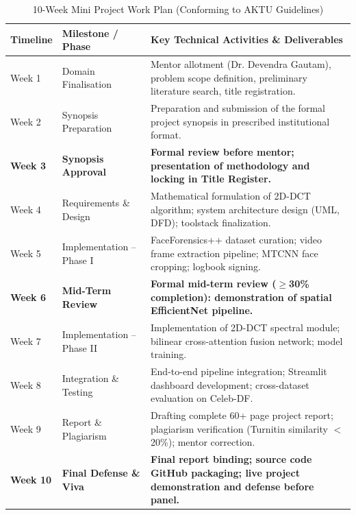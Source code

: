 \documentclass[12pt,a4paper]{report}
\begin{document}
\begin{table}[htbp]
\centering
\small
\caption{10-Week Mini Project Work Plan (Conforming to AKTU Guidelines)}
\label{tab:timeline}
\begin{tabular}{p{1.8cm} p{4.2cm} p{8.0cm}}
\toprule
\textbf{Timeline} & \textbf{Milestone / Phase} & \textbf{Key Technical Activities \& Deliverables} \\
\midrule
Week 1 & Domain Finalisation & Mentor allotment (Dr. Devendra Gautam), problem scope definition, preliminary literature search, title registration. \\
\addlinespace
Week 2 & Synopsis Preparation & Preparation and submission of the formal project synopsis in prescribed institutional format. \\
\addlinespace
\textbf{Week 3} & \textbf{Synopsis Approval} & \textbf{Formal review before mentor; presentation of methodology and locking in Title Register.} \\
\addlinespace
Week 4 & Requirements \& Design & Mathematical formulation of 2D-DCT algorithm; system architecture design (UML, DFD); toolstack finalization. \\
\addlinespace
Week 5 & Implementation -- Phase I & FaceForensics++ dataset curation; video frame extraction pipeline; MTCNN face cropping; logbook signing. \\
\addlinespace
\textbf{Week 6} & \textbf{Mid-Term Review} & \textbf{Formal mid-term review ($\ge$30\% completion): demonstration of spatial EfficientNet pipeline.} \\
\addlinespace
Week 7 & Implementation -- Phase II & Implementation of 2D-DCT spectral module; bilinear cross-attention fusion network; model training. \\
\addlinespace
Week 8 & Integration \& Testing & End-to-end pipeline integration; Streamlit dashboard development; cross-dataset evaluation on Celeb-DF. \\
\addlinespace
Week 9 & Report \& Plagiarism & Drafting complete 60+ page project report; plagiarism verification (Turnitin similarity $<$ 20\%); mentor correction. \\
\addlinespace
\textbf{Week 10} & \textbf{Final Defense \& Viva} & \textbf{Final report binding; source code GitHub packaging; live project demonstration and defense before panel.} \\
\bottomrule
\end{tabular}
\end{table}

\newpage
\end{document}
